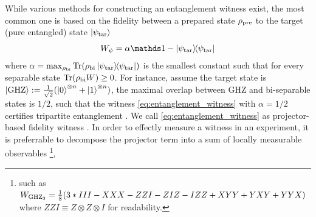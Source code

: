 \documentclass[
aps,
pra,
twocolumn,
floatfix,
]{revtex4-2}
\theoremstyle{plain}
\theoremstyle{definition}
\newtheorem{remark}{Remark}
\newcommand{\ew}{W}
\newcommand{\ob}{O}
\newcommand{\dm}{\rho}
\newcommand{\ghz}{\text{GHZ}}
\newcommand{\bi}{\text{bi}}
\newcommand{\target}{\textup{tar}}
\newcommand{\prepare}{\textup{pre}}
\newcommand{\px}{X}
\newcommand{\pz}{Z}
\begin{document}
While various methods for constructing an entanglement witness exist, the most common one is based on the fidelity between a prepared state $\dm_{\prepare}$ to the target (pure entangled) state $\ket{\psi_{\target}}$
\begin{equation}
	\ew_{\psi} = \alpha\identity - \op{\psi_\target} 
	\label{eq:entanglement_witness}
\end{equation}
where $\alpha = \max_{\dm_{\bi}} \Tr(\dm_{\bi}\op{\psi_{\target}})$ is the smallest constant such that for every separable state $\Tr(\dm_{\bi}\ew)\ge 0$.
For instance, assume the target state is $\ket{\ghz}:=\frac{1}{\sqrt{2}}(\ket{0}^{\otimes n} + \ket{1}^{\otimes n} )$,
the maximal overlap between GHZ and bi-separable states is $1/2$,
such that the witness \cref{eq:entanglement_witness} with $\alpha=1/2$ certifies tripartite entanglement
\cite{acinClassificationMixedThreequbit2001}.
We call \cref{eq:entanglement_witness} as projector-based fidelity witness \cite{bourennaneWitnessingMultipartiteEntanglement2004}.
In order to effectly measure a witness in an experiment, it is preferrable to decompose the projector term into a sum of locally measurable observables 
\footnote{such as 
	$\ew_{\ghz_3} = \frac{1}{8} \qty( 3*III - \px\px\px - \pz \pz I - \pz I\pz - I\pz \pz + XYY + YXY + YYX)$
	where $\pz \pz I\equiv \pz \otimes\pz \otimes I$ for readability. 
},
\end{document}

